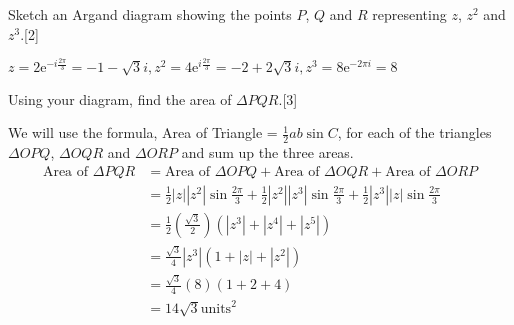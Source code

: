 \documentclass[12pt, a4 paper]{article}
\begin{document}
\begin{outline}[enumerate]
	\2 Sketch an Argand diagram showing the points $P$, $Q$ and $R$ representing $z$, $z^2$ and $z^3$.\hfill[2]
	\begin{answer}
		$z=2\mathrm{e}^{-i\frac{2\pi}{3}}=-1-\sqrt{3}i, z^2 = 4\mathrm{e}^{i\frac{2\pi}{3}}=-2+2\sqrt{3}i, z^3 = 8\mathrm{e}^{-2\pi i}=8$ \\
		\vspace{3mm}
	\end{answer}

	\2 Using your diagram, find the area of $\Delta PQR$.\hfill[3]
	\begin{answer}
		We will use the formula, Area of Triangle = $\frac{1}{2}ab\sin C$, for each of the triangles $\Delta OPQ$, $\Delta OQR$ and $\Delta ORP$ and sum up the three areas.
		\begin{align*}
			\textrm{Area of }\Delta PQR & = \textrm{Area of }\Delta OPQ + \textrm{Area of }\Delta OQR + \textrm{Area of }\Delta ORP                                      \\
			                            & = \frac{1}{2}|z||z^2|\sin{\frac{2\pi}{3}} + \frac{1}{2}|z^2||z^3|\sin{\frac{2\pi}{3}} +\frac{1}{2}|z^3||z|\sin{\frac{2\pi}{3}} \\
			                            & = \frac{1}{2}(\frac{\sqrt{3}}{2})(|z^3| + |z^4| + |z^5|)                                                                       \\
			                            & = \frac{\sqrt3}{4}|z^3|(1+|z|+|z^2|)                                                                                           \\
			                            & = \frac{\sqrt3}{4}(8)(1+2+4)                                                                                                   \\
			                            & = 14\sqrt{3}\textrm{units}^2
		\end{align*}
	\end{answer}


\end{outline}
\end{document}
